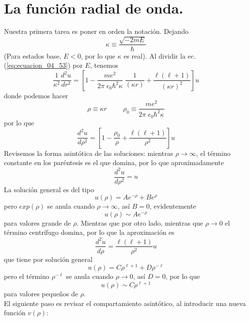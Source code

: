 \section{La función radial de onda.}
Nuestra primera tarea es poner en orden la notación. Dejando
\begin{equation}
\kappa \equiv \dfrac{\sqrt{-2 m E}}{\hbar}
\label{eq:ecuacion_04_54}
\end{equation}
(Para estados base, $E < 0$, por lo que $\kappa$ es real). Al dividir la ec. (\ref{eq:ecuacion_04_53}) por $E$, tenemos
\[ \dfrac{1}{\kappa^{2}} \dfrac{d^{2} u}{d r^{2}} = \left[1 - \dfrac{m e^{2}}{2 \pi \; \epsilon_{0} \hbar^{2} \kappa} \; \dfrac{1}{(\kappa r)} + \dfrac{\ell (\ell + 1)}{(\kappa r)^{2}} \right] u \]
donde podemos hacer
\begin{equation}
\rho \equiv \kappa r \hspace{1cm} \rho_{0} \equiv \dfrac{m e^{2}}{2 \pi \; \epsilon_{0} \hbar^{2} \kappa}
\label{eq:ecuacion_04_55}
\end{equation}
por lo que
\begin{equation}
\dfrac{d^{2} u}{d \rho^{2}} = \left[ 1 - \dfrac{\rho_{0}}{\rho} + \dfrac{\ell (\ell + 1)}{\rho^{2}} \right] u
\label{eq:ecuacion_04_56}
\end{equation}
Revisemos la forma asintótica de las soluciones: mientras $\rho \to \infty$, el término constante en los paréntesis es el que domina, por lo que aproximadamente
\[ \dfrac{d^{2} u}{d \rho^{2}} = u \]
La solución general es del tipo
\begin{equation}
u(\rho) = A e^{-\rho} + B e^{\rho}
\label{eq:ecuacion_04_57}
\end{equation}
pero $exp(\rho)$ se anula cuando $\rho \to \infty$, así $B=0$, evidentemente
\begin{equation}
u(\rho) \sim A e^{-\rho}
\label{eq:ecuacion_04_58}
\end{equation}
para valores grande de $\rho$. Mientras que por otro lado, mientras que $\rho \to 0$ el término centrífugo domina, por lo que la aproximación es
\[ \dfrac{d^{2} u}{d \rho} = \dfrac{\ell (\ell + 1)}{\rho^{2}} u \]
que tiene por solución general
\[ u(\rho) = C \rho^{\ell +1} + D \rho^{-\ell} \]
pero el término $\rho^{-\ell}$ se anula cuando $\rho \to 0$, así $D = 0$, por lo que
\begin{equation}
u(\rho) \sim C \rho^{\ell + 1}
\label{eq:ecuacion_04_59}
\end{equation}
para valores pequeños de $\rho$.
\\
El siguiente paso es revisar el compartamiento asintótico, al introducir una nueva función $v(\rho)$:
